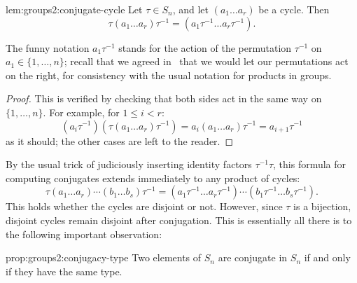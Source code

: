 \begin{lem}{}{lem:groups2:conjugate-cycle}
  Let $\tau \in S_n$, and let $(a_1 \dots a_r)$ be a cycle. Then
  \[
    \tau(a_1 \dots a_r)\tau^{-1} = (a_1\tau^{-1} \dots a_r\tau^{-1}).
  \]
\end{lem}

The funny notation $a_1\tau^{-1}$ stands for the action of the
permutation $\tau^{-1}$ on $a_1 \in \{1,\dots,n\}$; recall that we
agreed in~ that we would let
our permutations act on the right, for consistency with the usual
notation for products in groups.
\begin{proof}
  This is verified by checking that both sides act in the same way on
  $\{1,\dots,n\}$. For example, for $1 \leq i < r$:
  \[
    (a_i\tau^{-1})(\tau(a_1 \dots a_r)\tau^{-1}) = a_i(a_1 \dots
    a_r)\tau^{-1} = a_{i+1}\tau^{-1}
  \]
  as it should; the other cases are left to the reader.
\end{proof}
By the usual trick of judiciously inserting identity factors
$\tau^{-1}\tau$, this formula for computing conjugates extends
immediately to any product of cycles:
\[
  \tau(a_1 \dots a_r)\cdots(b_1 \dots b_s)\tau^{-1} = (a_1\tau^{-1}
  \dots a_r\tau^{-1})\cdots(b_1\tau^{-1} \dots b_s\tau^{-1}).
\]
This holds whether the cycles are disjoint or not. However, since
$\tau$ is a bijection, disjoint cycles remain disjoint after
conjugation. This is essentially all there is to the following
important observation:
\begin{prop}{}{prop:groups2:conjugacy-type}
  Two elements of $S_n$ are conjugate in $S_n$ if and only if they
  have the same type.
\end{prop}

